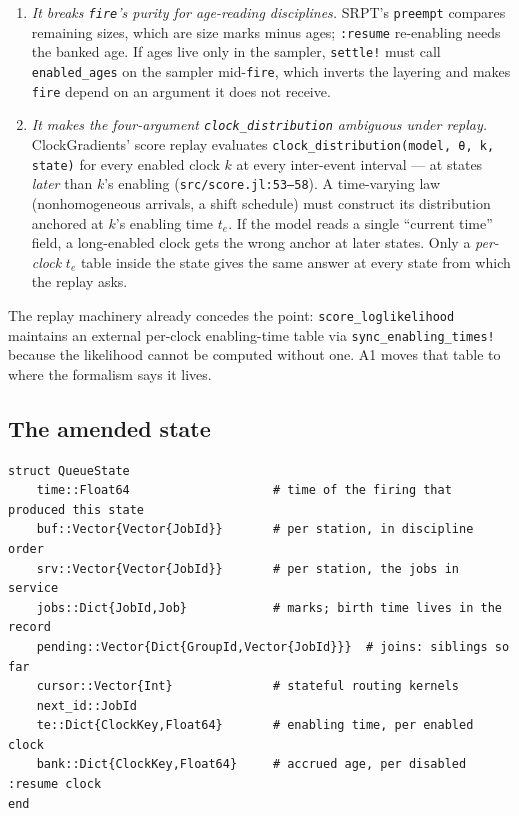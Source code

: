 \documentclass[11pt]{article}
\newcommand{\code}[1]{\texttt{#1}}
\begin{document}
\begin{enumerate}
\item \emph{It breaks \code{fire}'s purity for age-reading disciplines.}
  SRPT's \code{preempt} compares remaining sizes, which are size marks minus
  ages; \code{:resume} re-enabling needs the banked age. If ages live only in
  the sampler, \code{settle!} must call \code{enabled\_ages} on the sampler
  mid-\code{fire}, which inverts the layering and makes \code{fire} depend on
  an argument it does not receive.
\item \emph{It makes the four-argument \code{clock\_distribution} ambiguous
  under replay.} ClockGradients' score replay evaluates
  \code{clock\_distribution(model, θ, k, state)} for every enabled clock $k$
  at every inter-event interval --- at states \emph{later} than $k$'s
  enabling (\code{src/score.jl:53--58}). A time-varying law (nonhomogeneous
  arrivals, a shift schedule) must construct its distribution anchored at
  $k$'s enabling time $t_e$. If the model reads a single ``current time''
  field, a long-enabled clock gets the wrong anchor at later states. Only a
  \emph{per-clock} $t_e$ table inside the state gives the same answer at
  every state from which the replay asks.
\end{enumerate}

The replay machinery already concedes the point: \code{score\_loglikelihood}
maintains an external per-clock enabling-time table via
\code{sync\_enabling\_times!} because the likelihood cannot be computed
without one. A1 moves that table to where the formalism says it lives.

\subsection{The amended state}

\begin{lstlisting}
struct QueueState
    time::Float64                    # time of the firing that produced this state
    buf::Vector{Vector{JobId}}       # per station, in discipline order
    srv::Vector{Vector{JobId}}       # per station, the jobs in service
    jobs::Dict{JobId,Job}            # marks; birth time lives in the record
    pending::Vector{Dict{GroupId,Vector{JobId}}}  # joins: siblings so far
    cursor::Vector{Int}              # stateful routing kernels
    next_id::JobId
    te::Dict{ClockKey,Float64}       # enabling time, per enabled clock
    bank::Dict{ClockKey,Float64}     # accrued age, per disabled :resume clock
end
\end{lstlisting}
\end{document}
